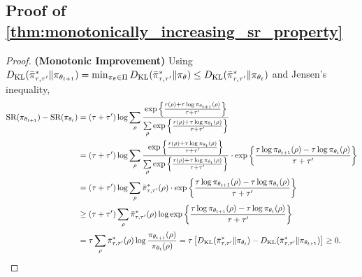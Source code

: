 \subsection{Proof of \cref{thm:monotonically_increasing_sr_property}}
\begin{proof}
	{\bf (Monotonic Improvement)} Using $D_{\mathrm{KL}}(\bar{\pi}_{\tau,\tau^{\prime}}^* \| \pi_{\theta_{t+1}}) = \min_{\pi_\theta \in \Pi}{ D_{\mathrm{KL}}(\bar{\pi}_{\tau,\tau^{\prime}}^* \| \pi_\theta)} \le D_{\mathrm{KL}}(\bar{\pi}_{\tau,\tau^{\prime}}^* \| \pi_{\theta_t})$ and Jensen's inequality,
	\begin{equation*}
	\begin{split}
	\text{SR}(\pi_{\theta_{t+1}}) - \text{SR}(\pi_{\theta_t}) &= (\tau + \tau^{\prime}) \log{ \sum\limits_{\rho}{ \frac{  \exp\left\{ \frac{r(\rho) + \tau \log{\pi_{\theta_{t+1}}(\rho)} }{\tau + \tau^{\prime}} \right\}  }{ \sum\limits_{\rho}{  \exp\left\{ \frac{r(\rho) + \tau \log{\pi_{\theta_t}(\rho)} }{\tau + \tau^{\prime}} \right\} } }  } } \\
	&= (\tau + \tau^{\prime}) \log{ \sum\limits_{\rho}{ \frac{  \exp\left\{ \frac{r(\rho) + \tau \log{\pi_{\theta_t}(\rho)} }{\tau + \tau^{\prime}} \right\}  }{ \sum\limits_{\rho}{  \exp\left\{ \frac{r(\rho) + \tau \log{\pi_{\theta_t}(\rho)} }{\tau + \tau^{\prime}} \right\} } }  } \cdot \exp\left\{ \frac{\tau \log{\pi_{\theta_{t+1}}(\rho)} - \tau \log{\pi_{\theta_t}(\rho)} }{\tau + \tau^{\prime}} \right\} } \\
	&= (\tau + \tau^{\prime}) \log{ \sum\limits_{\rho}{ \bar{\pi}_{\tau,\tau^{\prime}}^*(\rho) } \cdot \exp\left\{ \frac{\tau \log{\pi_{\theta_{t+1}}(\rho)} - \tau \log{\pi_{\theta_t}(\rho)} }{\tau + \tau^{\prime}} \right\} } \\
	&\ge (\tau + \tau^{\prime}) \sum\limits_{\rho}{ \bar{\pi}_{\tau,\tau^{\prime}}^*(\rho) \log{ \exp\left\{ \frac{\tau \log{\pi_{\theta_{t+1}}(\rho)} - \tau \log{\pi_{\theta_t}(\rho)} }{\tau + \tau^{\prime}} \right\} } } \\
	&= \tau \sum\limits_{\rho}{ \bar{\pi}_{\tau,\tau^{\prime}}^*(\rho) \log{ \frac{\pi_{\theta_{t+1}}(\rho)}{\pi_{\theta_t}(\rho)} } } = \tau \left[ D_{\mathrm{KL}}(\bar{\pi}_{\tau,\tau^{\prime}}^* \| \pi_{\theta_t}) - D_{\mathrm{KL}}(\bar{\pi}_{\tau,\tau^{\prime}}^* \| \pi_{\theta_{t+1}})\right] \ge 0.
	\end{split}
	\end{equation*}
	

\end{proof}
